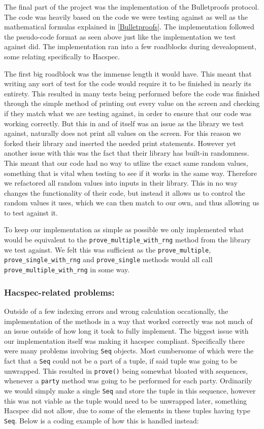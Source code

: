 \documentclass{article}
\begin{document}
The final part of the project was the implementation of the
Bulletproofs protocol. The code was heavily based on the code we
were testing against as well as the mathematical formulas explained
in \ref{Bulletproofs}. The implementation followed the pseudo-code
format as seen above just like the implementation we test against
did. The implementation ran into a few roadblocks during devealopment,
some relating specifically to Hacspec.

The first big roadblock was the immense length it would have. This
meant that writing any sort of test for the code would require it to
be finished in nearly its entirety. This resulted in many tests being
performed before the code was finished through the simple method of
printing out every value on the screen and checking if they match what
we are testing against, in order to ensure that our code was working
correctly. But this in and of itself was an issue as the library we
test against, naturally does not print all values on the screen. For
this reason we forked their library and inserted the needed print
statements. However yet another issue with this was the fact that their
library has built-in randomness. This meant that our code had no way
to utlize the exact same random values, something that is vital when
testing to see if it works in the same way. Therefore we refactored all
random values into inputs in their library. This in no way changes the
functionality of their code, but instead it allows us to control the
random values it uses, which we can then match to our own, and thus
allowing us to test against it.

To keep our implementation as simple as possible we only implemented
what would be equivalent to the \texttt{prove\_multiple\_with\_rng}
method from the library we test against. We felt this was sufficient
as the \texttt{prove\_multiple}, \texttt{prove\_single\_with\_rng}
and \texttt{prove\_single} methods would all call
\texttt{prove\_multiple\_with\_rng} in some way.

\subsubsection{Hacspec-related problems:}

Outside of a few indexing errors and wrong calculation occationally, the implementation of the methods in a way that worked correctly was not much of an issue outside of how long it took to fully implement. The biggest issue with our implementation itself was making it hacspec compliant. Specifically there were many problems involving \texttt{Seq} objects. Most cumbersome of which were the fact that a \texttt{Seq} could not be a part of a tuple, if said tuple was going to be unwrapped. This resulted in \texttt{prove()} being somewhat bloated with sequences, whenever a \texttt{party} method was going to be performed for each party. Ordinarily we would simply make a single \texttt{Seq} and store the tuple in this sequence, however this was not viable as the tuple would need to be unwrapped later, something Hacspec did not allow, due to some of the elements in these tuples having type \texttt{Seq}. Below is a coding example of how this is handled instead:
\end{document}

